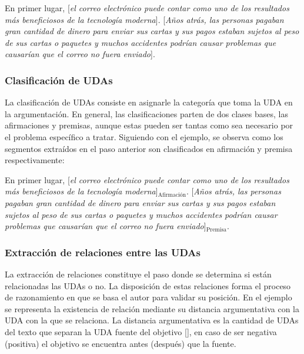 \begin{adjustwidth}{25pt}{25pt}
    En primer lugar, [\emph{el correo electrónico puede contar como uno de los resultados
    más beneficiosos de la tecnología moderna}]. [\emph{Años atrás, las personas pagaban gran cantidad de dinero para 
    enviar sus cartas y sus pagos estaban sujetos al peso de sus cartas o paquetes y muchos accidentes podrían 
    causar problemas que causarían que el correo no fuera enviado}].
\end{adjustwidth}

\subsubsection{Clasificación de UDAs}

La clasificación de UDAs consiste en asignarle la categoría que toma la UDA en la argumentación. En general, 
las clasificaciones parten de dos clases bases, las afirmaciones y premisas, aunque estas pueden ser tantas
como sea necesario por el problema específico a tratar. Siguiendo con el ejemplo, se observa como los 
segmentos extraídos en el paso anterior son clasificados en afirmación y premisa respectivamente: 

\begin{adjustwidth}{25pt}{25pt}
    En primer lugar, [\emph{el correo electrónico puede contar como uno de los resultados
    más beneficiosos de la tecnología moderna}]$_{\mathrm{Afirmación}}$. [\emph{Años atrás, las personas pagaban gran cantidad de dinero para 
    enviar sus cartas y sus pagos estaban sujetos al peso de sus cartas o paquetes y muchos accidentes podrían 
    causar problemas que causarían que el correo no fuera enviado}]$_{\mathrm{Premisa}}$.
\end{adjustwidth}

\subsubsection{Extracción de relaciones entre las UDAs}

La extracción de relaciones constituye el paso donde se determina si están relacionadas las UDAs o no. 
La disposición de estas relaciones forma el proceso de razonamiento en que se basa el autor para validar 
su posición. En el ejemplo se representa la existencia de relación mediante su distancia argumentativa con 
la UDA con la que se relaciona. La distancia argumentativa es la cantidad de UDAs del texto que separan la 
UDA fuente del objetivo [\cite{galassi2021deep}], en caso de ser negativa (positiva) el objetivo se encuentra 
antes (después) que la fuente.


